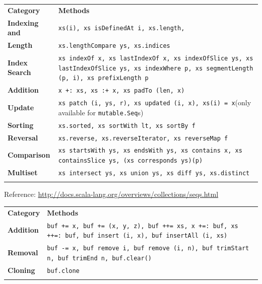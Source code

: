 \documentclass[a4paper,twoside,10pt,landscape]{article}
\begin{document}
\begin{multicols}{3}
\begin{center}
\begin{tabular}{@{}lp{6.5cm}@{}}
\hline\noalign{\smallskip}
\textbf{Category} & \textbf{Methods} \\
\noalign{\smallskip}\hline\noalign{\smallskip}
\textbf{Indexing and} & \texttt{xs(i), xs isDefinedAt i, xs.length,}\\
\textbf{Length} & \texttt{xs.lengthCompare ys, xs.indices}\\
\textbf{Index Search} & \texttt{xs indexOf x, xs lastIndexOf x, xs indexOfSlice ys, xs lastIndexOfSlice ys, xs indexWhere p, xs segmentLength (p, i), xs prefixLength p}\\
\textbf{Addition} & \texttt{x +: xs, xs :+ x, xs padTo (len, x)}\\
\textbf{Update} & \texttt{xs patch (i, ys, r), xs updated (i, x), xs(i) = x}(only available for \texttt{mutable.Seq}s)\\
\textbf{Sorting} & \texttt{xs.sorted, xs sortWith lt, xs sortBy f}\\
\textbf{Reversal} & \texttt{xs.reverse, xs.reverseIterator, xs reverseMap f}\\
\textbf{Comparison} & \texttt{xs startsWith ys, xs endsWith ys, xs contains x, xs containsSlice ys, (xs corresponds ys)(p)}\\
\textbf{Multiset} & \texttt{xs intersect ys, xs union ys, xs diff ys, xs.distinct}\\
\noalign{\smallskip}\hline
\end{tabular}
\raggedright{\tiny{Reference: \url{http://docs.scala-lang.org/overviews/collections/seqs.html}}}
\end{center}

\begin{center}
\begin{tabular}{@{}lp{6.5cm}@{}}
\hline\noalign{\smallskip}
\textbf{Category} & \textbf{Methods} \\
\noalign{\smallskip}\hline\noalign{\smallskip}
\textbf{Addition} & \texttt{buf += x, buf += (x, y, z), buf ++= xs, x +=: buf, xs ++=: buf, buf insert (i, x), buf insertAll (i, xs)}\\
\textbf{Removal} & \texttt{buf -= x, buf remove i, buf remove (i, n), buf trimStart n, buf trimEnd n, buf.clear()}\\
\textbf{Cloning} & \texttt{buf.clone}\\
\noalign{\smallskip}\hline
\end{tabular}
\end{center}



\end{multicols}
\end{document}
